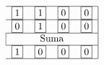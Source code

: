 \begin{frame}
\begin{solution}
\begin{center}
               \end{center}

                
                    
                \[
                \begin{tabular}{c c c c|}
                \hline
                \fbox{1} & \fbox{1} & \fbox{0} & \fbox{0} \\
                \hline
                \fbox{0} & \fbox{1} & \fbox{0} & \fbox{0} \\
                \hline
                \multicolumn{4}{|c|}{\text{Suma}} \\
                \hline
                \fbox{1} & \fbox{0} & \fbox{0} & \fbox{0} \\
                \hline
                \end{tabular}
                \]
                




               
	\end{solution}
\end{frame}